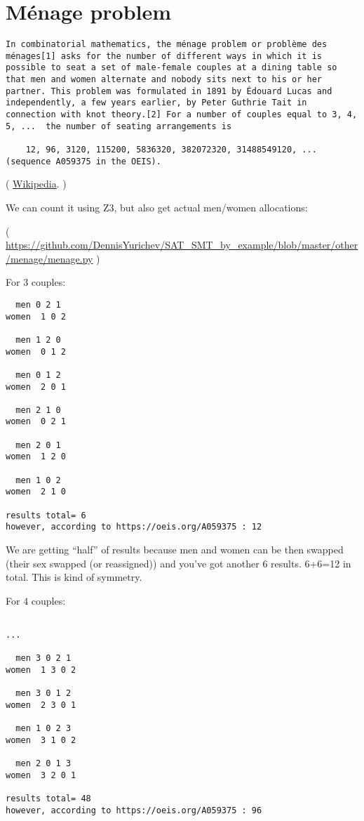 \section{Ménage problem}

\begin{lstlisting}
In combinatorial mathematics, the ménage problem or problème des ménages[1] asks for the number of different ways in which it is possible to seat a set of male-female couples at a dining table so that men and women alternate and nobody sits next to his or her partner. This problem was formulated in 1891 by Édouard Lucas and independently, a few years earlier, by Peter Guthrie Tait in connection with knot theory.[2] For a number of couples equal to 3, 4, 5, ...  the number of seating arrangements is

    12, 96, 3120, 115200, 5836320, 382072320, 31488549120, ... (sequence A059375 in the OEIS). 
\end{lstlisting}

( \href{https://en.wikipedia.org/wiki/M%C3%A9nage_problem}{Wikipedia}. )

We can count it using Z3, but also get actual men/women allocations:



( \url{https://github.com/DennisYurichev/SAT_SMT_by_example/blob/master/other/menage/menage.py} )

For 3 couples:

\begin{lstlisting}
  men 0 2 1
women  1 0 2

  men 1 2 0
women  0 1 2

  men 0 1 2
women  2 0 1

  men 2 1 0
women  0 2 1

  men 2 0 1
women  1 2 0

  men 1 0 2
women  2 1 0

results total= 6
however, according to https://oeis.org/A059375 : 12
\end{lstlisting}

We are getting ``half'' of results because men and women can be then swapped (their sex swapped (or reassigned))
and you've got another 6 results.
6+6=12 in total.
This is kind of symmetry.

For 4 couples:

\begin{lstlisting}

...

  men 3 0 2 1
women  1 3 0 2

  men 3 0 1 2
women  2 3 0 1

  men 1 0 2 3
women  3 1 0 2

  men 2 0 1 3
women  3 2 0 1

results total= 48
however, according to https://oeis.org/A059375 : 96
\end{lstlisting}

